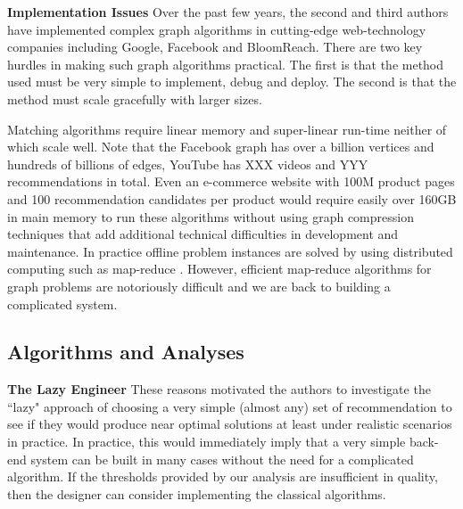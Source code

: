 {\bf Implementation Issues} Over the past few years, the second and
third authors have implemented complex graph algorithms in
cutting-edge web-technology companies including Google, Facebook and
BloomReach. There are two key hurdles in making such graph algorithms
practical. The first is that the method used must be very simple to
implement, debug and deploy. The second is that the method must scale
gracefully with larger sizes. \vs

Matching algorithms require linear memory and super-linear run-time
neither of which scale well. Note that the Facebook graph has over a
billion vertices\cite{} and hundreds of billions of edges\cite{},
YouTube has XXX videos and YYY recommendations\cite{} in total. Even an
e-commerce website with 100M product pages and 100 recommendation candidates per
product would require easily over 160GB in main memory to run these
algorithms without using graph compression techniques that add additional technical difficulties
in development and maintenance. In practice offline problem instances are solved by using
distributed computing such as map-reduce \cite{DeanGhemawat2004}. 
However, efficient map-reduce algorithms for graph problems
are notoriously difficult and we are back to building a complicated
system. \vs


\subsection{Algorithms and Analyses}

{\bf The Lazy Engineer} These reasons motivated the authors to
investigate the ``lazy" approach of choosing a very simple (almost
any) set of recommendation to see if they would produce near optimal
solutions at least under realistic scenarios in practice.  In
practice, this would immediately imply that a very simple back-end
system can be built in many cases without the need for a complicated
algorithm. If the thresholds provided by our analysis are insufficient
in quality, then the designer can consider implementing the classical
algorithms. \vs

